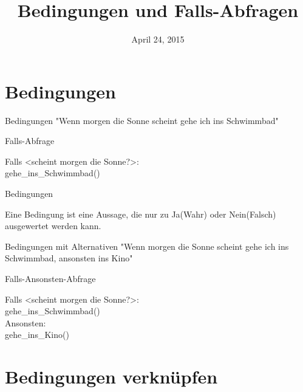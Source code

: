 \documentclass[xcolor=svgnames,handout,ngerman]{beamer}
\title
  [\hspace{2em}]
  {Bedingungen und Falls-Abfragen}
\author
  [CoderDojoKa]{}
\date
  {April 24, 2015}
\institute
  {CoderDojo Karlsruhe}
\begin{document}
\maketitle

\section
  {Bedingungen}

\begin{frame}
	{Bedingungen}
  "Wenn morgen die Sonne scheint gehe ich ins Schwimmbad"
  
\end{frame}

\begin{frame}
	{Falls-Abfrage}
	

	Falls \textless scheint morgen die Sonne?\textgreater:
	\\
	\noindent\hspace*{12mm} gehe\_ins\_Schwimmbad()
	
\end{frame}



\begin{frame}
	{Bedingungen}
	
	Eine Bedingung ist eine Aussage, die nur zu Ja(Wahr) oder Nein(Falsch) ausgewertet werden kann.
	
\end{frame}


\begin{frame}
	{Bedingungen mit Alternativen}
	"Wenn morgen die Sonne scheint gehe ich ins Schwimmbad, ansonsten ins Kino"
	
\end{frame}

\begin{frame}
	{Falls-Ansonsten-Abfrage}
	
	
	Falls \textless scheint morgen die Sonne?\textgreater:
	\\
	\noindent\hspace*{12mm} gehe\_ins\_Schwimmbad()
	\\
	Ansonsten:
	\\
	\noindent\hspace*{12mm} gehe\_ins\_Kino()
	
\end{frame}

\section
  {Bedingungen verknüpfen}
\end{document}
